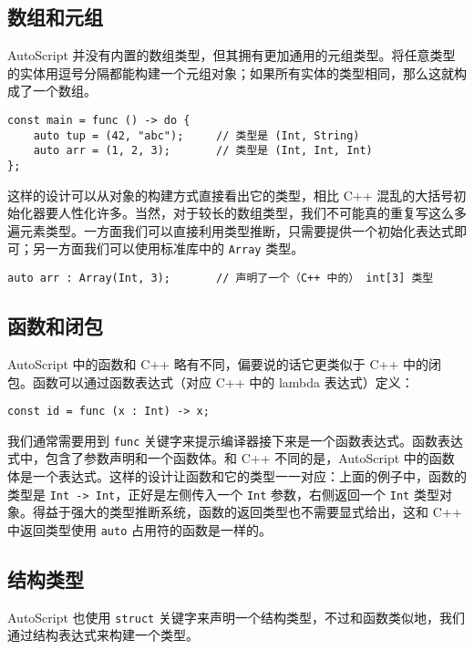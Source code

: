 \subsection{数组和元组}

AutoScript 并没有内置的数组类型，但其拥有更加通用的元组类型。将任意类型的实体用逗号分隔都能构建一个元组对象；如果所有实体的类型相同，那么这就构成了一个数组。

\begin{lstlisting}
const main = func () -> do {
	auto tup = (42, "abc");		// 类型是 (Int, String)
	auto arr = (1, 2, 3);		// 类型是 (Int, Int, Int)
};
\end{lstlisting}

这样的设计可以从对象的构建方式直接看出它的类型，相比 C++ 混乱的大括号初始化器要人性化许多。当然，对于较长的数组类型，我们不可能真的重复写这么多遍元素类型。一方面我们可以直接利用类型推断，只需要提供一个初始化表达式即可；另一方面我们可以使用标准库中的 \lstinline!Array! 类型。

\begin{lstlisting}
auto arr : Array(Int, 3);		// 声明了一个（C++ 中的） int[3] 类型
\end{lstlisting}


\subsection{函数和闭包}

AutoScript 中的函数和 C++ 略有不同，偏要说的话它更类似于 C++ 中的闭包。函数可以通过函数表达式（对应 C++ 中的 lambda 表达式）定义：

\begin{lstlisting}
const id = func (x : Int) -> x;
\end{lstlisting}

我们通常需要用到 \lstinline!func! 关键字来提示编译器接下来是一个函数表达式。函数表达式中，包含了参数声明和一个函数体。和 C++ 不同的是，AutoScript 中的函数体是一个表达式。这样的设计让函数和它的类型一一对应：上面的例子中，函数的类型是 \lstinline!Int -> Int!，正好是左侧传入一个 \lstinline!Int! 参数，右侧返回一个 \lstinline!Int! 类型对象。得益于强大的类型推断系统，函数的返回类型也不需要显式给出，这和 C++ 中返回类型使用 \lstinline!auto! 占用符的函数是一样的。


\subsection{结构类型}

AutoScript 也使用 \lstinline!struct! 关键字来声明一个结构类型，不过和函数类似地，我们通过结构表达式来构建一个类型。


